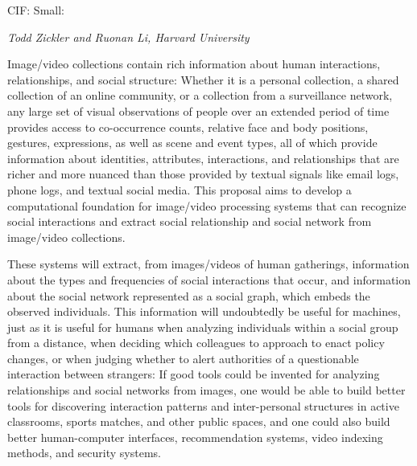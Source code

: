 \pagestyle{empty}

\noindent\textsf{CIF: Small:}\vspace{0.9ex}\\

\vspace{1.0ex}
\noindent \textsf{\large \em Todd Zickler and Ruonan Li, Harvard University}
\vspace{2.0ex}



\noindent Image/video collections contain rich information about human interactions, relationships, and social structure: Whether it is a personal collection, a shared collection of an online community, or a collection from a surveillance network, any large set of visual observations of people over an extended period of time provides access to co-occurrence counts, relative face and body positions, gestures, expressions, as well as scene and event types, all of which provide information about identities, attributes, interactions, and relationships that are richer and more nuanced than those provided by textual signals like email logs, phone logs, and textual social media. This proposal aims to develop a computational foundation for image/video processing systems that can recognize social interactions and extract social relationship and social network from image/video collections. 

These systems will extract, from images/videos of human gatherings, information about the types and frequencies of social interactions that occur, and information about the social network represented as a social graph, which embeds the observed individuals. This information will undoubtedly be useful for machines, just as it is useful for humans when analyzing individuals within a social group from a distance, when deciding which colleagues to approach to enact policy changes, or when judging whether to alert authorities of a questionable interaction between strangers: If good tools could be invented for analyzing relationships and social networks from images, one would be able to build better tools for discovering interaction patterns and inter-personal structures in active classrooms, sports matches, and other public spaces, and one could also build better human-computer interfaces, recommendation systems, video indexing methods, and security systems.

